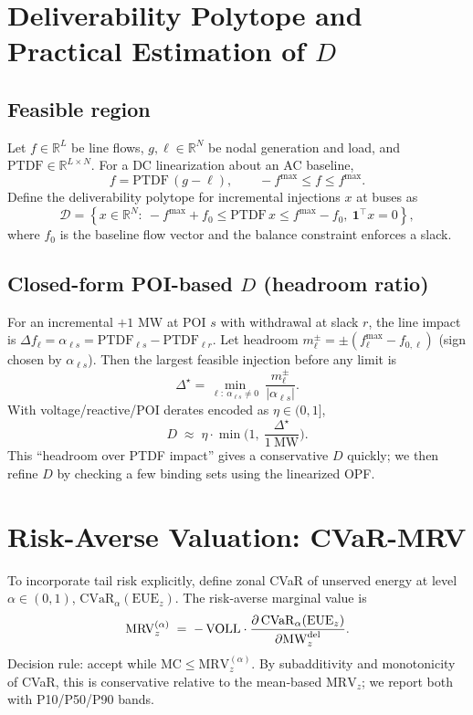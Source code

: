 \documentclass[11pt]{article}
\newcommand{\VOLL}{\ensuremath{\mathrm{VOLL}}}
\newcommand{\EUE}{\ensuremath{\mathrm{EUE}}}
\newcommand{\MRV}{\ensuremath{\mathrm{MRV}}}
\newcommand{\MC}{\ensuremath{\mathrm{MC}}}
\numberwithin{equation}{section}
\theoremstyle{definition}
\theoremstyle{remark}
\begin{document}
\section{Deliverability Polytope and Practical Estimation of \texorpdfstring{\(D\)}{D}}
\label{sec:deliverability-polytope}

\subsection{Feasible region}
Let \(f\in\mathbb R^{L}\) be line flows, \(g,\ell\in\mathbb R^{N}\) be nodal generation and load,
and \(\mathrm{PTDF}\in\mathbb R^{L\times N}\).
For a DC linearization about an AC baseline,
\[
f = \mathrm{PTDF}\,(g-\ell),\qquad -f^{\max} \le f \le f^{\max}.
\]
Define the deliverability polytope for incremental injections \(x\) at buses as
\[
\mathcal D = \left\{ x\in\mathbb R^{N}:\ 
-f^{\max}+f_0 \le \mathrm{PTDF}\,x \le f^{\max}-f_0,\ \mathbf{1}^\top x=0 \right\},
\]
where \(f_0\) is the baseline flow vector and the balance constraint enforces a slack.

\subsection{Closed-form POI-based \texorpdfstring{$D$}{D} (headroom ratio)}
For an incremental \(+1\) MW at POI \(s\) with withdrawal at slack \(r\),
the line impact is \(\Delta f_\ell = \alpha_{\ell s} = \mathrm{PTDF}_{\ell s}-\mathrm{PTDF}_{\ell r}\).
Let headroom \(m_\ell^\pm = \pm(f_\ell^{\max}-f_{0,\ell})\) (sign chosen by \(\alpha_{\ell s}\)).
Then the largest feasible injection before any limit is
\[
\Delta^\star = \min_{\ell:\ \alpha_{\ell s}\neq 0}\ \frac{m_\ell^\pm}{|\alpha_{\ell s}|}.
\]
With voltage/reactive/POI derates encoded as \(\eta\in(0,1]\),
\[
D \;\approx\; \eta \cdot \min\!\Big(1,\ \frac{\Delta^\star}{1\ \mathrm{MW}}\Big).
\]
This “headroom over PTDF impact” gives a conservative \(D\) quickly; we then refine \(D\) by checking a few binding sets using the linearized OPF.

\section{Risk-Averse Valuation: CVaR-MRV}
\label{sec:cvar-mrv}

To incorporate tail risk explicitly, define zonal CVaR of unserved energy at level \(\alpha\in(0,1)\),
\(\mathrm{CVaR}_\alpha(\EUE_z)\).
The risk‑averse marginal value is
\[
\MRV^{(\alpha)}_z \;=\; -\,\VOLL\cdot 
\frac{\partial\,\mathrm{CVaR}_\alpha(\EUE_z)}{\partial \MWdel_z}.
\]
Decision rule: accept while \(\MC \le \MRV^{(\alpha)}_z\).
By subadditivity and monotonicity of CVaR, this is conservative relative to the mean‑based \(\MRV_z\); we report both with P10/P50/P90 bands.
\end{document}
